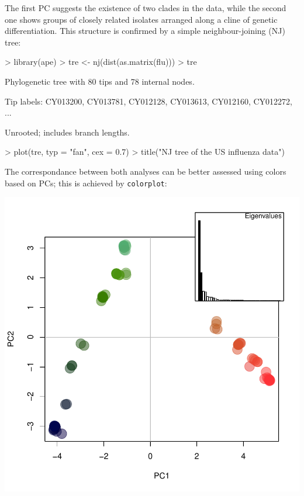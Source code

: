 \documentclass{article}
\begin{document}
The first PC suggests the existence of two clades in the data, while the second one shows groups of
closely related isolates arranged along a cline of genetic differentiation.
This structure is confirmed by a simple neighbour-joining (NJ) tree:
\begin{Schunk}
\begin{Sinput}
> library(ape)
> tre <- nj(dist(as.matrix(flu)))
> tre
\end{Sinput}
\begin{Soutput}
Phylogenetic tree with 80 tips and 78 internal nodes.

Tip labels:
	 CY013200,  CY013781,  CY012128,  CY013613,  CY012160,  CY012272, ...

Unrooted; includes branch lengths.
\end{Soutput}
\begin{Sinput}
> plot(tre, typ = "fan", cex = 0.7)
> title("NJ tree of the US influenza data")
\end{Sinput}
\end{Schunk}

The correspondance between both analyses can be better assessed using colors based on PCs; this is
achieved by \texttt{colorplot}:
\begin{Schunk}
\end{Schunk}
\includegraphics{figs/genomics-055}
\end{document}
